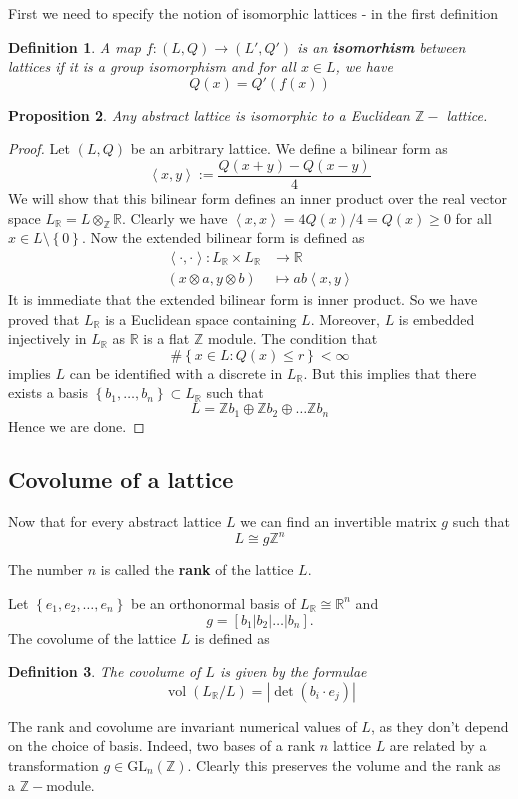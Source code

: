 \documentclass[12pt]{article} %
\newtheorem{definition}{Definition}[section]
\newtheorem{prop}[definition]{Proposition}
\DeclareMathOperator{\vol}{vol}
\newcommand{\tpoint}[1]{\subsection{#1}}
\begin{document}
First we need to specify the notion of isomorphic lattices - in the first definition
\begin{definition}
    A map $f \colon (L,Q)   \to (L',Q')$  is an \textbf{isomorhism} between lattices if it is a group isomorphism and
    for all $x \in L$, we have
    \[Q(x) = Q'(f(x)) \]
\end{definition}
\begin{prop}\label{equiv-def}
    Any abstract lattice is isomorphic to a Euclidean $\mathbb{Z}-$ lattice.
\end{prop}
\begin{proof}
    Let $(L,Q)$ be an arbitrary lattice. We define a bilinear form as
    \[ \left\langle x,y \right\rangle := \dfrac{Q(x+y)-Q(x-y)}{4}\]
    We will show that this bilinear form defines an inner product over the real vector space $L_\mathbb{R} = L \otimes_\mathbb{Z} \mathbb{R}$.
    Clearly we have $\left\langle x,x \right\rangle = 4Q(x)/4 = Q(x) \ge 0$ for all $x  \in L \setminus \left\lbrace 0 \right\rbrace$.
    Now the extended bilinear form is defined as
    \begin{align*}
        \left\langle \cdot,\cdot \right\rangle  \colon L_\mathbb{R} \times L_\mathbb{R} & \to      \mathbb{R}                      \\
        (x\otimes a, y \otimes b)                                                       & \mapsto  ab\left\langle x,y\right\rangle
    \end{align*}
    It is immediate that the extended bilinear form is inner product. So we have proved that
    $L_\mathbb{R}$ is a Euclidean space containing $L$. Moreover, $L$ is embedded injectively in $L_\mathbb{R}$
    as $\mathbb{R}$ is a flat $\mathbb{Z}$ module. The condition that
    \[ \# \left\lbrace x \in L: Q(x) \le r\right\rbrace < \infty\]
    implies $L$ can be identified with a discrete in $L_\mathbb{R}$. But this implies that there exists a basis
    $\left\lbrace b_1,\ldots,b_n\right\rbrace \subset L_\mathbb{R}$  such that
    \[L = \mathbb{Z}b_1\oplus \mathbb{Z}b_2\oplus \ldots \mathbb{Z}b_n\]
    Hence we are done.
\end{proof}
\tpoint{Covolume of a lattice}
Now that for every abstract lattice $L$ we can find an invertible matrix $g$ such that
\[ L  \cong g\mathbb{Z}^n\]

The number $n$ is called the \textbf{rank} of the lattice $L$.

Let $\left\lbrace e_1,e_2,\ldots,e_n \right\rbrace$ be an orthonormal basis of $L_\mathbb{R} \cong \mathbb{R}^n$ and
\[g = [b_1 | b_2 | \ldots | b_n] .\] The covolume of the lattice
$L$ is defined as
\begin{definition}
    The covolume of $L$ is given by the formulae
    \[\vol(L_\mathbb{R}/L) = \left|\det(b_i\cdot e_j)\right|\]
\end{definition}
The rank and covolume are invariant numerical values of $L$, as they don't depend on the choice of basis. Indeed, two bases of a rank $n$ lattice $L$
are related by a transformation $g \in \text{GL}_n(\mathbb{Z})$. Clearly this preserves the volume and the rank as a $\mathbb{Z}-$module.
\end{document}
